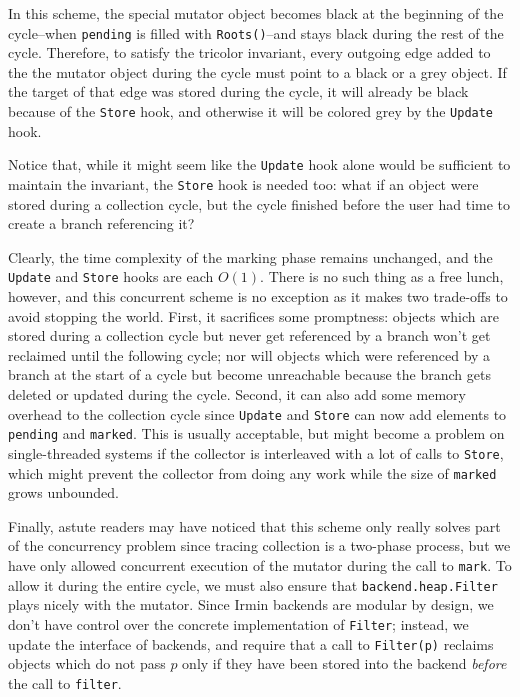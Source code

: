 

\bigskip
In this scheme, the special mutator object becomes black at the beginning of the cycle--when \texttt{pending} is filled with \texttt{Roots()}--and stays black during the rest of the cycle. Therefore, to satisfy the tricolor invariant, every outgoing edge added to the the mutator object during the cycle must point to a black or a grey object. If the target of that edge was stored during the cycle, it will already be black because of the \texttt{Store} hook, and otherwise it will be colored grey by the \texttt{Update} hook.

Notice that, while it might seem like the \texttt{Update} hook alone would be sufficient to maintain the invariant, the \texttt{Store} hook is needed too: what if an object were stored during a collection cycle, but the cycle finished before the user had time to create a branch referencing it?

Clearly, the time complexity of the marking phase remains unchanged, and the \texttt{Update} and \texttt{Store} hooks are each \(O(1)\). There is no such thing as a free lunch, however, and this concurrent scheme is no exception as it makes two trade-offs to avoid stopping the world. First, it sacrifices some promptness: objects which are stored during a collection cycle but never get referenced by a branch won't get reclaimed until the following cycle; nor will objects which were referenced by a branch at the start of a cycle but become unreachable because the branch gets deleted or updated during the cycle. Second, it can also add some memory overhead to the collection cycle since \texttt{Update} and \texttt{Store} can now add elements to \texttt{pending} and \texttt{marked}. This is usually acceptable, but might become a problem on single-threaded systems if the collector is interleaved with a lot of calls to \texttt{Store}, which might prevent the collector from doing any work while the size of \texttt{marked} grows unbounded.

Finally, astute readers may have noticed that this scheme only really solves part of the concurrency problem since tracing collection is a two-phase process, but we have only allowed concurrent execution of the mutator during the call to \texttt{mark}. To allow it during the entire cycle, we must also ensure that \texttt{backend.heap.Filter} plays nicely with the mutator. Since Irmin backends are modular by design, we don't have control over the concrete implementation of \texttt{Filter}; instead, we update the interface of backends, and require that a call to \texttt{Filter(p)} reclaims objects which do not pass \(p\) only if they have been stored into the backend \emph{before} the call to \texttt{filter}.

